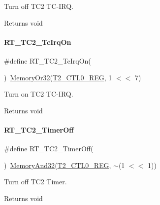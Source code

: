 Turn off T\+C2 T\+C-\/\+I\+RQ. 

\begin{DoxyReturn}{Returns}
void 
\end{DoxyReturn}
\mbox{\label{a00047_a0d385385ff809f653b9e7a6d6a111838}} 
\paragraph{\texorpdfstring{R\+T\+\_\+\+T\+C2\+\_\+\+Tc\+Irq\+On}{RT\_TC2\_TcIrqOn}}
{\footnotesize\ttfamily \#define R\+T\+\_\+\+T\+C2\+\_\+\+Tc\+Irq\+On(\begin{DoxyParamCaption}{ }\end{DoxyParamCaption})~\mbox{\hyperlink{a00020_a27874a97deab7cecdde5ddecf466e31e}{Memory\+Or32}}(\mbox{\hyperlink{a00020_a5853553391e986211306d4f29ab31e47}{T2\+\_\+\+C\+T\+L0\+\_\+\+R\+EG}}, 1 $<$$<$ 7)}



Turn on T\+C2 T\+C-\/\+I\+RQ. 

\begin{DoxyReturn}{Returns}
void 
\end{DoxyReturn}
\mbox{\label{a00047_a4328299fe0323ef75508eadf9b937ba1}} 
\paragraph{\texorpdfstring{R\+T\+\_\+\+T\+C2\+\_\+\+Timer\+Off}{RT\_TC2\_TimerOff}}
{\footnotesize\ttfamily \#define R\+T\+\_\+\+T\+C2\+\_\+\+Timer\+Off(\begin{DoxyParamCaption}{ }\end{DoxyParamCaption})~\mbox{\hyperlink{a00020_ad87cedffcaadc51db22594fce55173d4}{Memory\+And32}}(\mbox{\hyperlink{a00020_a5853553391e986211306d4f29ab31e47}{T2\+\_\+\+C\+T\+L0\+\_\+\+R\+EG}}, $\sim$(1 $<$$<$ 1))}



Turn off T\+C2 Timer. 

\begin{DoxyReturn}{Returns}
void 
\end{DoxyReturn}
\mbox{\label{a00047_ab274ee44af2080d68745b2ec3af06648}} 
